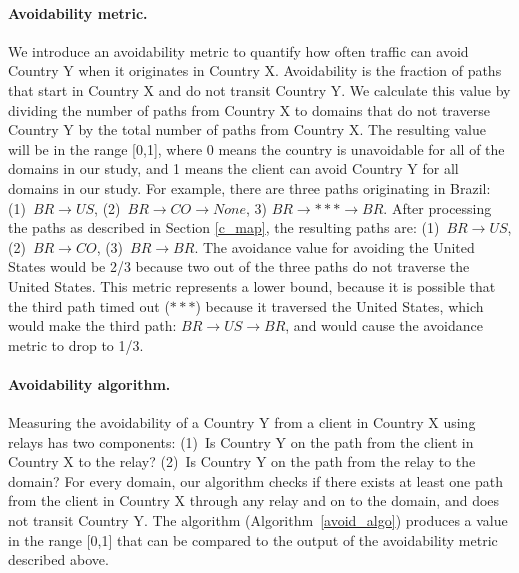\paragraph{Avoidability metric.}  We introduce an avoidability metric to
quantify how often
traffic can avoid Country Y when it originates in Country X.
Avoidability is the fraction of paths that start in Country
X and do not transit Country Y.  We calculate this value by dividing the
number of paths from Country X to domains that do not traverse Country Y
by the total number of paths from Country X. The resulting value will be
in the range [0,1], where 0 means the country is unavoidable for all of
the domains in our study, and 1 means the client can avoid Country Y for
all domains in our study.  For example, there are three paths
originating in Brazil: (1)~$BR \rightarrow US$, (2)~$BR \rightarrow CO
\rightarrow None$, 3) $BR \rightarrow *** \rightarrow BR$.  After
processing the paths as described in Section \ref{c_map}, the resulting
paths are: (1)~$BR \rightarrow US$, (2)~$BR \rightarrow CO$, (3)~$BR
\rightarrow BR$.  The avoidance value for avoiding the United States
would be 2/3 because two out of the three paths do not traverse the
United States.  This metric represents a lower bound,
because it is possible that the third path timed out ($***$) because it
traversed the United States, which would make the third path: $BR
\rightarrow US \rightarrow BR$, and would cause the avoidance metric to
drop to 1/3.


\paragraph{Avoidability algorithm.}  Measuring the avoidability of a Country Y from a client in Country X using relays has two components: (1)~Is Country Y on the path from the client in Country X to the relay?  (2)~Is Country Y on the path from the relay to the domain?  For every domain, our algorithm checks if there exists at least one path from the client in Country X through any relay and on to the domain, and does not transit Country Y.  
The algorithm (Algorithm~\ref{avoid_algo}) produces a value in the range
[0,1] that can be compared to the output of the avoidability metric
described above.   

